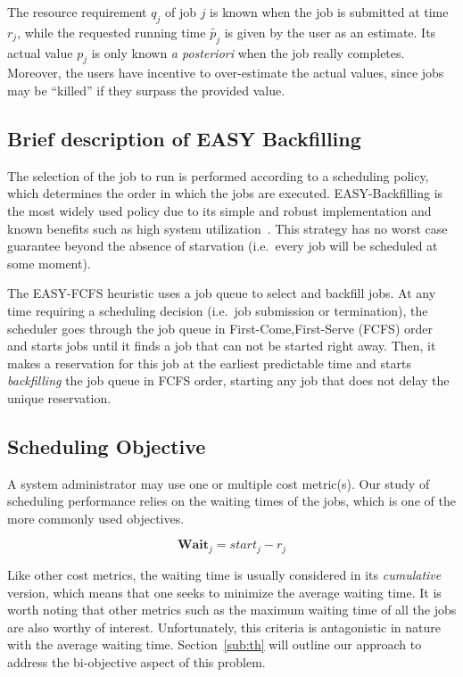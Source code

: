 \documentclass[sigconf,anonymous]{acmart}
\begin{document}
The resource requirement $q_j$ of job $j$ is known when the job is submitted at
time $r_j$, while the requested running time $\widetilde{p_j}$ is given by the
user as an estimate. Its actual value $p_j$ is only known \textit{a posteriori}
when the job really completes.  Moreover, the users have incentive to
over-estimate the actual values, since jobs may be ``killed'' if they surpass
the provided value.

\subsection{Brief description of EASY Backfilling}
\label{sub:easy}

The selection of the job to run is performed according to a scheduling policy,
which determines the order in which the jobs are executed. EASY-Backfilling is
the most widely used policy due to its simple and robust implementation and
known benefits such as high system utilization~\cite{easy}. This strategy has
no worst case guarantee beyond the absence of starvation (i.e.\ every job will
be scheduled at some moment).

The EASY-FCFS heuristic uses a job queue to select and backfill jobs.  At any
time requiring a scheduling decision (i.e.\ job submission or termination),
the scheduler goes through the job queue in First-Come,First-Serve (FCFS) order
and starts jobs until it finds a job that can not be started right away. Then,
it makes a reservation for this job at the earliest predictable time and
starts \textit{backfilling} the job queue in FCFS order, starting any job that
does not delay the unique reservation.

\subsection{Scheduling Objective}
\label{sub:scheduling_objectives}

A system administrator may use one or multiple cost metric(s). Our study of
scheduling performance relies on the waiting times of the jobs, which is one of
the more commonly used objectives.

     \begin{equation}
       \textbf{Wait}_j =  start_j-r_j
     \end{equation}

Like other cost metrics, the waiting time is usually considered in its
\textit{cumulative} version, which means that one seeks to minimize the average
waiting time. It is worth noting that other metrics such as the maximum waiting
time of all the jobs are also worthy of interest. Unfortunately, this criteria
is antagonistic in nature with the average waiting time. Section~\ref{sub:th}
will outline our approach to address the bi-objective aspect of this problem.
\end{document}
